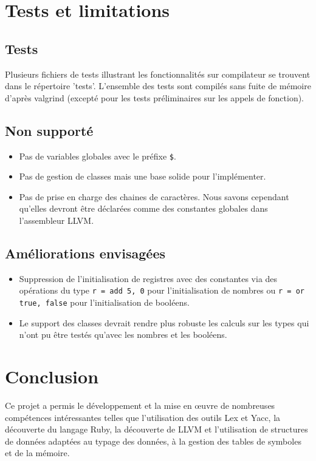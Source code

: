 \documentclass[12pt]{article}
\begin{document}
\section{Tests et limitations}

\subsection{Tests}

Plusieurs fichiers de tests illustrant les fonctionnalités sur compilateur se trouvent dans le répertoire 'tests'. L'ensemble des tests sont compilés sans fuite de mémoire d'après valgrind (excepté pour les tests préliminaires sur les appels de fonction).

\subsection{Non supporté}
\begin{itemize}
	\item Pas de variables globales avec le préfixe \verb!$!.
	\item Pas de gestion de classes mais une base solide pour l'implémenter.
	\item Pas de prise en charge des chaines de caractères. Nous savons cependant qu'elles devront être déclarées comme des constantes globales dans l'assembleur LLVM.
\end{itemize}

\subsection{Améliorations envisagées}
\begin{itemize}
	\item Suppression de l'initialisation de registres avec des constantes via des opérations du type \verb!r = add 5, 0! pour l'initialisation de nombres ou \verb!r = or true, false! pour l'initialisation de booléens.
	\item Le support des classes devrait rendre plus robuste les calculs sur les types qui n'ont pu être testés qu'avec les nombres et les booléens.
\end{itemize}

\section{Conclusion}

Ce projet a permis le développement et la mise en œuvre de nombreuses compétences intéressantes telles que l'utilisation des outils Lex et Yacc, la découverte du langage Ruby, la découverte de LLVM et l'utilisation de structures de données adaptées au typage des données, à la gestion des tables de symboles et de la mémoire.
\end{document}
